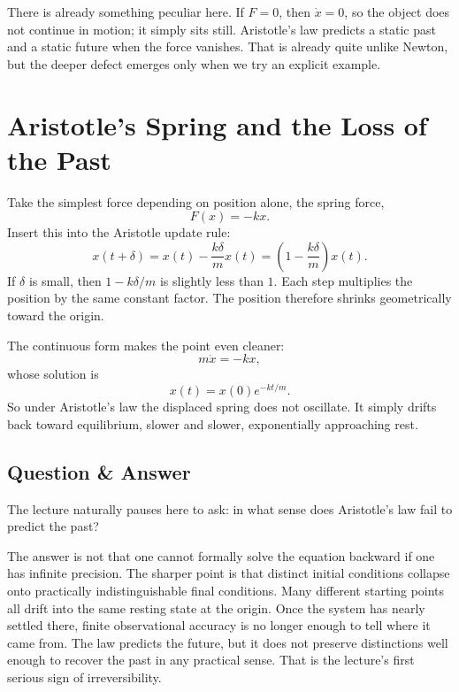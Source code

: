 There is already something peculiar here. If \(F=0\), then \(\dot x=0\), so the object does not continue in motion; it simply sits still. Aristotle's law predicts a static past and a static future when the force vanishes. That is already quite unlike Newton, but the deeper defect emerges only when we try an explicit example.

\section{Aristotle's Spring and the Loss of the Past}

Take the simplest force depending on position alone, the spring force,
\begin{equation}
F(x)=-kx.
\end{equation}
Insert this into the Aristotle update rule:
\begin{equation}
x(t+\delta)=x(t)-\frac{k\delta}{m}x(t)
=\left(1-\frac{k\delta}{m}\right)x(t).
\end{equation}
If \(\delta\) is small, then \(1-k\delta/m\) is slightly less than \(1\). Each step multiplies the position by the same constant factor. The position therefore shrinks geometrically toward the origin.

The continuous form makes the point even cleaner:
\begin{equation}
m\dot x=-kx,
\end{equation}
whose solution is
\begin{equation}
x(t)=x(0)e^{-kt/m}.
\end{equation}
So under Aristotle's law the displaced spring does not oscillate. It simply drifts back toward equilibrium, slower and slower, exponentially approaching rest.

\subsection{Question \& Answer}

The lecture naturally pauses here to ask: in what sense does Aristotle's law fail to predict the past?

The answer is not that one cannot formally solve the equation backward if one has infinite precision. The sharper point is that distinct initial conditions collapse onto practically indistinguishable final conditions. Many different starting points all drift into the same resting state at the origin. Once the system has nearly settled there, finite observational accuracy is no longer enough to tell where it came from. The law predicts the future, but it does not preserve distinctions well enough to recover the past in any practical sense. That is the lecture's first serious sign of irreversibility.

